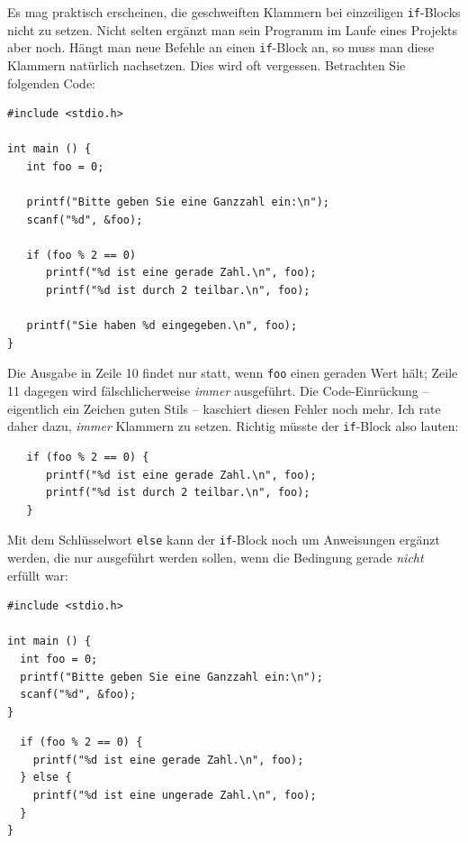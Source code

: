\begin{warnbox}
Es mag praktisch erscheinen, die geschweiften Klammern bei einzeiligen \texttt{if}-Blocks nicht zu setzen. Nicht selten ergänzt man sein Programm im Laufe eines Projekts aber noch. Hängt man neue Befehle an einen \texttt{if}-Block an, so muss man diese Klammern natürlich nachsetzen. Dies wird oft vergessen. Betrachten Sie folgenden Code:

\begin{warnbox}[Beispiel: Fehlerhafter \texttt{if}-Block durch fehlende Klammern, leftupper=7mm]
\begin{verbatim}
#include <stdio.h>

int main () {
   int foo = 0;
   
   printf("Bitte geben Sie eine Ganzzahl ein:\n");
   scanf("%d", &foo);
   
   if (foo % 2 == 0)
      printf("%d ist eine gerade Zahl.\n", foo);
      printf("%d ist durch 2 teilbar.\n", foo);
   
   printf("Sie haben %d eingegeben.\n", foo);
}
\end{verbatim}
\end{warnbox}

Die Ausgabe in Zeile 10 findet nur statt, wenn \texttt{foo} einen geraden Wert hält; Zeile 11 dagegen wird fälschlicherweise \emph{immer} ausgeführt. Die Code-Einrückung -- eigentlich ein Zeichen guten Stils -- kaschiert diesen Fehler noch mehr. Ich rate daher dazu, \emph{immer} Klammern zu setzen. Richtig müsste der \texttt{if}-Block also lauten:

\begin{codebox}
\begin{verbatim}
   if (foo % 2 == 0) {
      printf("%d ist eine gerade Zahl.\n", foo);
      printf("%d ist durch 2 teilbar.\n", foo);
   }
\end{verbatim}
\end{codebox}
\end{warnbox}

Mit dem Schlüsselwort \texttt{else} kann der \texttt{if}-Block noch um Anweisungen ergänzt werden, die nur ausgeführt werden sollen, wenn die Bedingung gerade \emph{nicht} erfüllt war:

\begin{codebox}
\begin{verbatim}
#include <stdio.h>

int main () {
  int foo = 0;
  printf("Bitte geben Sie eine Ganzzahl ein:\n");
  scanf("%d", &foo);
}
\end{verbatim}
\end{codebox}
%
\begin{codebox}[]
\begin{verbatim}
  if (foo % 2 == 0) {
    printf("%d ist eine gerade Zahl.\n", foo);
  } else {
    printf("%d ist eine ungerade Zahl.\n", foo);
  }
}
\end{verbatim}
\end{codebox}

